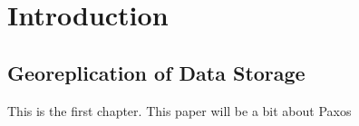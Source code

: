 
\renewcommand{\thechapter}{1}

\chapter{Introduction}

\section{Georeplication of Data Storage}

This is the first chapter. This paper will be a bit about Paxos~\cite{paxos}

